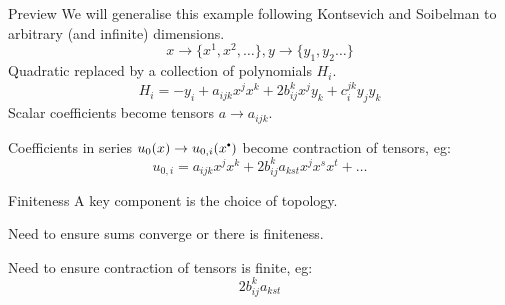     
    
    \begin{frame}{Preview}
    We will generalise this example following Kontsevich and Soibelman to arbitrary (and infinite) dimensions.
    \[ x\rightarrow \{x^1,x^2, \dots \}, y \rightarrow \{y_1, y_2 \dots\}\] 
    Quadratic replaced by a collection of polynomials \(H_i\).
    \[ H_i = -y_i + a_{ijk}x^j x^k + 2 b_{ij}^k x^j y_k + c_{i}^{jk} y_{j} y_k\]
    Scalar coefficients become tensors \(a \rightarrow a_{ijk}\).

    Coefficients in series \(u_{0}(x) \rightarrow u_{0,i}(x^{\sbt})\) become contraction of tensors, eg: 
    \[u_{0,i} = a_{ijk} x^j x^k + 2 b_{ij}^k a_{k st}x^j x^s x^t + \dots \]
    
    
    
    \end{frame}

    \begin{frame}{Finiteness}
    A key component is the choice of topology.
    
    Need to ensure sums converge or there is finiteness.
    
    Need to ensure contraction of tensors is finite, eg:
    \[ 2 b_{ij}^k a_{k st}\]
    
    

    \end{frame}

    
    
    
